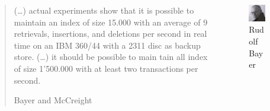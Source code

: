 \begin{frame}
    \begin{columns}
        \begin{column}{0.7\textwidth}
            \begin{block}{}
                \blockquote[Bayer and McCreight]{%
                    (\ldots) actual experiments show that it is possible 
                    to maintain an index of size 15.000 with an average of 9 retrievals, 
                    insertions, and deletions per second in real time on an IBM 360/44 
                    with a 2311 disc as backup store. (\ldots) it should be possible 
                    to main tain all index of size 1'500.000 with at least two transactions 
                    per second.}
            \end{block}
        \end{column}
        \begin{column}{0.3\textwidth}
            \begin{block}{}
                \begin{figure}
                    \includegraphics[height=0.3\textheight]{resources/made/r_bayer.png}
                    \caption[]{Rudolf Bayer}
                \end{figure}
                \begin{figure}

\end{figure}
\end{block}
\end{column}
\end{columns}
\end{frame}
